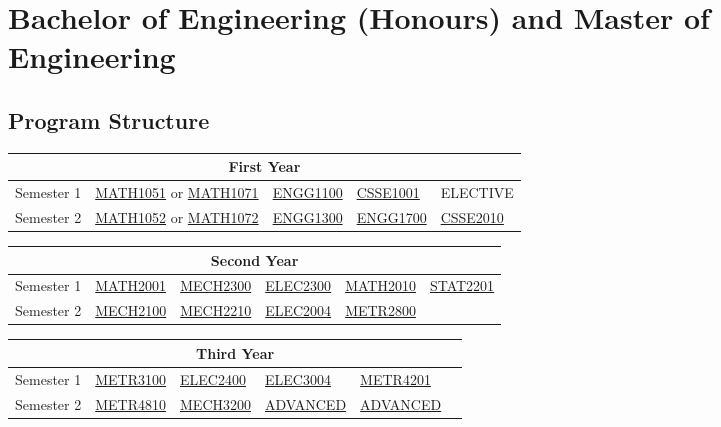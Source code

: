 \newpage

\section{Bachelor of Engineering (Honours) and Master of Engineering}
\subsection{Program Structure}
\renewcommand{\arraystretch}{1.5}
\begin{table}[H]
    \centering
    \begin{tabular}{| m{6em} | m{5em} m{5em} m{5em} m{5em} m{5em} |}
        \hline
        \multicolumn{6}{|c|}{\bfseries First Year} \\
        \hline
        Semester 1 & \multicolumn{2}{c}{\hyperlink{MATH1051}{MATH1051} or \hyperlink{MATH1071}{MATH1071}} & \hyperlink{ENGG1100}{ENGG1100} & \hyperlink{CSSE1001}{CSSE1001} & ELECTIVE \\
        Semester 2 & \multicolumn{2}{c}{\hyperlink{MATH1052}{MATH1052} or \hyperlink{MATH1072}{MATH1072}} & \hyperlink{ENGG1300}{ENGG1300} & \hyperlink{ENGG1700}{ENGG1700} & \hyperlink{CSSE2010}{CSSE2010} \\
        \hline
    \end{tabular}
\end{table}
\begin{table}[H]
    \centering
    \begin{tabular}{| m{6em} | m{5em} m{5em} m{5em} m{5em} m{5em} |}
        \hline
        \multicolumn{6}{|c|}{\bfseries Second Year} \\
        \hline
        Semester 1 & \hyperlink{MATH2001}{MATH2001} & \hyperlink{MECH2300}{MECH2300} & \hyperlink{ELEC2300}{ELEC2300} & \hyperlink{MATH2010}{MATH2010} & \hyperlink{STAT2201}{STAT2201} \\
        Semester 2 & \hyperlink{MECH2100}{MECH2100} & \hyperlink{MECH2210}{MECH2210} & \hyperlink{ELEC2004}{ELEC2004} & \hyperlink{METR2800}{METR2800} & \\
        \hline
    \end{tabular}
\end{table}
\begin{table}[H]
    \centering
    \begin{tabular}{| m{6em} | m{5em} m{5em} m{5em} m{5em} m{5em} |}
        \hline
        \multicolumn{6}{|c|}{\bfseries Third Year} \\
        \hline
        Semester 1 & \hyperlink{METR3100}{METR3100} & \hyperlink{ELEC2400}{ELEC2400} & \hyperlink{ELEC3004}{ELEC3004} & \hyperlink{METR4201}{METR4201} & \\
        Semester 2 & \hyperlink{METR4810}{METR4810} & \hyperlink{MECH3200}{MECH3200} & \hyperlink{ADVANCED}{ADVANCED} & \hyperlink{ADVANCED}{ADVANCED} & \\
        \hline
    \end{tabular}
\end{table}
